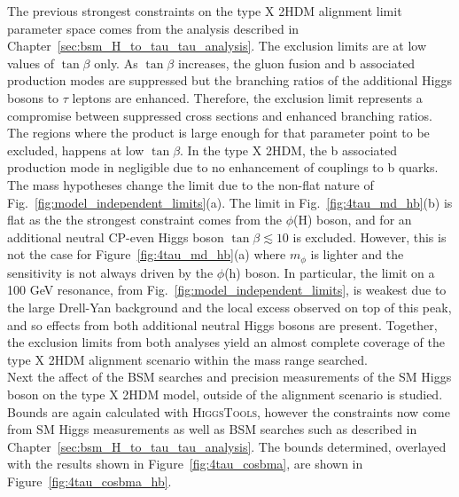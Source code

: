 The previous strongest constraints on the type X \ac{2HDM} alignment limit parameter space comes from the analysis described in Chapter~\ref{sec:bsm_H_to_tau_tau_analysis}.
The exclusion limits are at low values of $\tan\beta$ only.
As $\tan\beta$ increases, the gluon fusion and b associated production modes are suppressed but the branching ratios of the additional Higgs bosons to $\tau$ leptons are enhanced.
Therefore, the exclusion limit represents a compromise between suppressed cross sections and enhanced branching ratios. 
The regions where the product is large enough for that parameter point to be excluded, happens at low $\tan\beta$.
In the type X \ac{2HDM}, the b associated production mode in negligible due to no enhancement of couplings to b quarks.
The mass hypotheses change the limit due to the non-flat nature of Fig.~\ref{fig:model_independent_limits}(a).
The limit in Fig.~\ref{fig:4tau_md_hb}(b) is flat as the the strongest constraint comes from the $\phi$(H) boson, and for an additional neutral \ac{CP}-even Higgs boson $\tan\beta \lesssim 10$ is excluded.
However, this is not the case for Figure~\ref{fig:4tau_md_hb}(a) where $m_{\phi}$ is lighter and the sensitivity is not always driven by the $\phi$(h) boson.
In particular, the limit on a 100 GeV resonance, from Fig.~\ref{fig:model_independent_limits}, is weakest due to the large Drell-Yan background and the local excess observed on top of this peak, and so effects from both additional neutral Higgs bosons are present.
Together, the exclusion limits from both analyses yield an almost complete coverage of the type X 2HDM alignment scenario within the mass range searched. \\

Next the affect of the \ac{BSM} searches and precision measurements of the \ac{SM} Higgs boson on the type X \ac{2HDM} model, outside of the alignment scenario is studied.
Bounds are again calculated with \textsc{HiggsTools}, however the constraints now come from \ac{SM} Higgs measurements as well as \ac{BSM} searches such as described in Chapter~\ref{sec:bsm_H_to_tau_tau_analysis}.
The bounds determined, overlayed with the results shown in Figure~\ref{fig:4tau_cosbma}, are shown in Figure~\ref{fig:4tau_cosbma_hb}. \\

